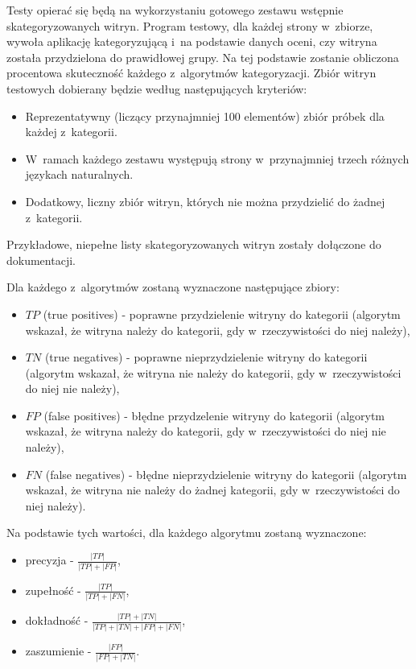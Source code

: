 \documentclass[a4paper,10pt]{article}
\begin{document}
Testy opierać się będą na wykorzystaniu gotowego zestawu wstępnie skategoryzowanych witryn. Program testowy, dla każdej strony w~zbiorze, wywoła aplikację kategoryzującą i~na podstawie danych oceni, czy witryna została przydzielona do prawidłowej grupy. Na tej podstawie zostanie obliczona procentowa skuteczność każdego z~algorytmów kategoryzacji. Zbiór witryn testowych dobierany będzie według następujących kryteriów:

\begin{itemize}
 \item Reprezentatywny (liczący przynajmniej 100 elementów) zbiór próbek dla każdej z~kategorii.
 \item W~ramach każdego zestawu występują strony w~przynajmniej trzech różnych językach naturalnych.
 \item Dodatkowy, liczny zbiór witryn, których nie można przydzielić do żadnej z~kategorii.
\end{itemize}

\noindent Przykładowe, niepełne listy skategoryzowanych witryn zostały dołączone do dokumentacji.

Dla każdego z~algorytmów zostaną wyznaczone następujące zbiory:

\begin{itemize}
 \item $TP$ (true positives) - poprawne przydzielenie witryny do kategorii (algorytm wskazał, że witryna należy do kategorii, gdy w~rzeczywistości do niej należy),
 \item $TN$ (true negatives) - poprawne nieprzydzielenie witryny do kategorii (algorytm wskazał, że witryna nie należy do kategorii, gdy w~rzeczywistości do niej nie należy),
 \item $FP$ (false positives) - błędne przydzelenie witryny do kategorii (algorytm wskazał, że witryna należy do kategorii, gdy w~rzeczywistości do niej nie należy),
 \item $FN$ (false negatives) - błędne nieprzydzielenie witryny do kategorii (algorytm wskazał, że witryna nie należy do żadnej kategorii, gdy w~rzeczywistości do niej należy).
\end{itemize}

\noindent Na podstawie tych wartości, dla każdego algorytmu zostaną wyznaczone:

\begin{itemize}
 \item precyzja - $\frac{|TP|}{|TP| + |FP|}$,
 \item zupełność - $\frac{|TP|}{|TP| + |FN|}$,
 \item dokładność - $\frac{|TP| + |TN|}{|TP| + |TN| + |FP| + |FN|}$,
 \item zaszumienie - $\frac{|FP|}{|FP| + |TN|}$.
\end{itemize}
\end{document}
